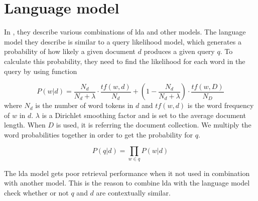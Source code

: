 \section{Language model}
In \cite{yang2009topic}, they describe various combinations of \gls{lda} and other models. 
The language model they describe is similar to a query likelihood model, which generates a probability of how likely a given document $d$ produces a given query $q$.
To calculate this probability, they need to find the likelihood for each word in the query by using function 

$$ P(w|d) = \frac{N_d}{N_d + \lambda} \cdot \frac{tf(w,d)}{N_d} + (1 - \frac{N_d}{N_d + \lambda}) \cdot \frac{tf(w,D)}{N_D} $$
where $N_d$ is the number of word tokens in $d$ and $tf(w,d)$ is the word frequency of $w$ in $d$. $\lambda$ is a Dirichlet smoothing factor and is set to the average document length.
When $D$ is used, it is referring the document collection.
We multiply the word probabilities together in order to get the probability for $q$.

$$ P(q|d) = \prod_{w \in q} P(w|d) $$
 
The \gls{lda} model gets poor retrieval performance when it not used in combination with another model.
This is the reason to combine \gls{lda} with the language model check whether or not $q$ and $d$ are contextually similar.
